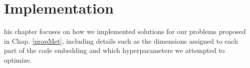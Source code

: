 
\chapter{Implementation} \label{chap:implementation}

his chapter focuses on how we implemented solutions for our problems proposed in Chap. \ref{propMet}, including details such as the dimensions assigned to each part of the code embedding and which hyperparameters we attempted to optimize.





